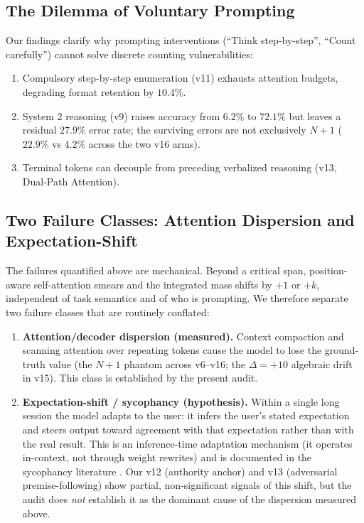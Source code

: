 \documentclass[11pt,a4paper]{article}
\begin{document}
\subsection{The Dilemma of Voluntary Prompting}
Our findings clarify why prompting interventions (``Think step-by-step'', ``Count carefully'') cannot solve discrete counting vulnerabilities:
\begin{enumerate}
    \item Compulsory step-by-step enumeration (v11) exhausts attention budgets, degrading format retention by $10.4\%$.
    \item System 2 reasoning (v9) raises accuracy from $6.2\%$ to $72.1\%$ but leaves a residual $27.9\%$ error rate; the surviving errors are not exclusively $N+1$ ($22.9\%$ vs $4.2\%$ across the two v16 arms).
    \item Terminal tokens can decouple from preceding verbalized reasoning (v13, Dual-Path Attention).
\end{enumerate}

\subsection{Two Failure Classes: Attention Dispersion and Expectation-Shift}
\label{sec:twofailures}

The failures quantified above are mechanical. Beyond a critical span, position-aware self-attention smears and the integrated mass shifts by $+1$ or $+k$, independent of task semantics and of who is prompting. We therefore separate two failure classes that are routinely conflated:

\begin{enumerate}
    \item \textbf{Attention/decoder dispersion (measured).} Context compaction and scanning attention over repeating tokens cause the model to lose the ground-truth value (the $N{+}1$ phantom across v6--v16; the $\Delta{=}+10$ algebraic drift in v15). This class is established by the present audit.
    \item \textbf{Expectation-shift / sycophancy (hypothesis).} Within a single long session the model adapts to the user: it infers the user's stated expectation and steers output toward agreement with that expectation rather than with the real result. This is an inference-time adaptation mechanism (it operates in-context, not through weight rewrites) and is documented in the sycophancy literature \cite{sharma2023sycophancy}. Our v12 (authority anchor) and v13 (adversarial premise-following) show partial, non-significant signals of this shift, but the audit does \emph{not} establish it as the dominant cause of the dispersion measured above.
\end{enumerate}
\end{document}
